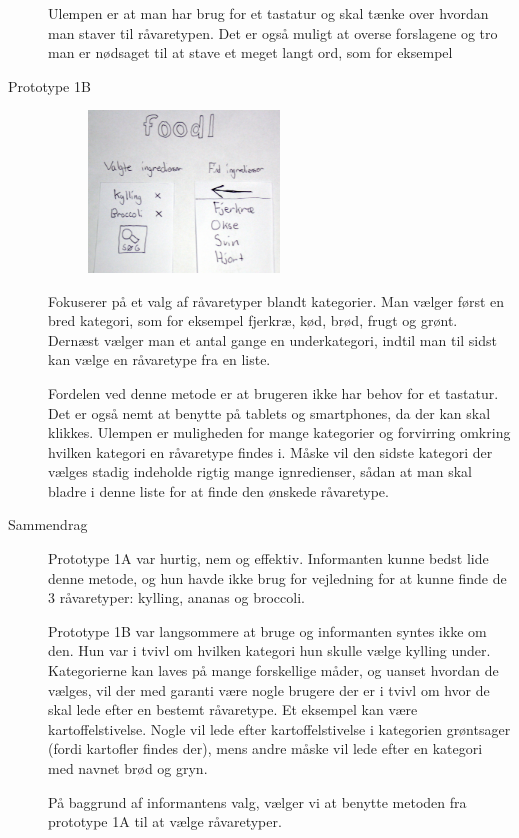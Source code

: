 \begin{description}
Ulempen er at man har brug for et tastatur og skal tænke over hvordan man staver til råvaretypen. Det er også muligt at overse forslagene og tro man er nødsaget til at stave et meget langt ord, som for eksempel 

\item[Prototype 1B]

\begin{figure}[H]
\centering
\includegraphics[width=0.5\textwidth]{billeder/prototyper/prototype1b.jpg}
\label{fig:prototype1b}
\end{figure}

Fokuserer på et valg af råvaretyper blandt kategorier. Man vælger først en bred kategori, som for eksempel fjerkræ, kød, brød, frugt og grønt. Dernæst vælger man et antal gange en underkategori, indtil man til sidst kan vælge en råvaretype fra en liste.

Fordelen ved denne metode er at brugeren ikke har behov for et tastatur. Det er også nemt at benytte på tablets og smartphones, da der kan skal klikkes. Ulempen er muligheden for mange kategorier og forvirring omkring hvilken kategori en råvaretype findes i. Måske vil den sidste kategori der vælges stadig indeholde rigtig mange ignredienser, sådan at man skal bladre i denne liste for at finde den ønskede råvaretype. 

\item[Sammendrag] Prototype 1A var hurtig, nem og effektiv. Informanten kunne bedst lide denne metode, og hun havde ikke brug for vejledning for at kunne finde de 3 råvaretyper: kylling, ananas og broccoli.

Prototype 1B var langsommere at bruge og informanten syntes ikke om den. Hun var i tvivl om hvilken kategori hun skulle vælge kylling under. Kategorierne kan laves på mange forskellige måder, og uanset hvordan de vælges, vil der med garanti være nogle brugere der er i tvivl om hvor de skal lede efter en bestemt råvaretype. Et eksempel kan være kartoffelstivelse. Nogle vil lede efter kartoffelstivelse i kategorien grøntsager (fordi kartofler findes der), mens andre måske vil lede efter en kategori med navnet brød og gryn.

På baggrund af informantens valg, vælger vi at benytte metoden fra prototype 1A til at vælge råvaretyper.
\end{description}
